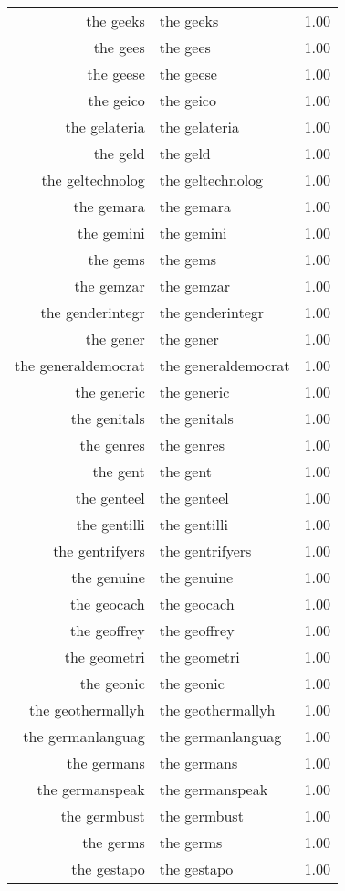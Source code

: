 \begin{table}[ht]
\begin{tabular}{rlr}
  the geeks & the geeks & 1.00 \\ 
  the gees & the gees & 1.00 \\ 
  the geese & the geese & 1.00 \\ 
  the geico & the geico & 1.00 \\ 
  the gelateria & the gelateria & 1.00 \\ 
  the geld & the geld & 1.00 \\ 
  the geltechnolog & the geltechnolog & 1.00 \\ 
  the gemara & the gemara & 1.00 \\ 
  the gemini & the gemini & 1.00 \\ 
  the gems & the gems & 1.00 \\ 
  the gemzar & the gemzar & 1.00 \\ 
  the genderintegr & the genderintegr & 1.00 \\ 
  the gener & the gener & 1.00 \\ 
  the generaldemocrat & the generaldemocrat & 1.00 \\ 
  the generic & the generic & 1.00 \\ 
  the genitals & the genitals & 1.00 \\ 
  the genres & the genres & 1.00 \\ 
  the gent & the gent & 1.00 \\ 
  the genteel & the genteel & 1.00 \\ 
  the gentilli & the gentilli & 1.00 \\ 
  the gentrifyers & the gentrifyers & 1.00 \\ 
  the genuine & the genuine & 1.00 \\ 
  the geocach & the geocach & 1.00 \\ 
  the geoffrey & the geoffrey & 1.00 \\ 
  the geometri & the geometri & 1.00 \\ 
  the geonic & the geonic & 1.00 \\ 
  the geothermallyh & the geothermallyh & 1.00 \\ 
  the germanlanguag & the germanlanguag & 1.00 \\ 
  the germans & the germans & 1.00 \\ 
  the germanspeak & the germanspeak & 1.00 \\ 
  the germbust & the germbust & 1.00 \\ 
  the germs & the germs & 1.00 \\ 
  the gestapo & the gestapo & 1.00 \\ 

\end{tabular}
\end{table}
